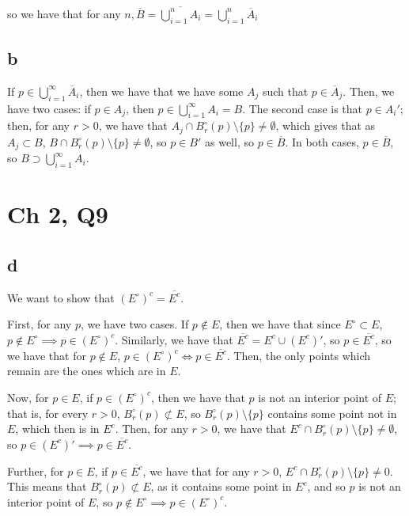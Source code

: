 \documentclass[12pt,letterpaper]{article}
\theoremstyle{definition}
\begin{document}
so we have that for any $n, \overline{B} = \overline{\bigcup_{i=1}^{n}A_{i}} = \bigcup_{i=1}^{n}\overline{A}_{i}$

\subsection*{b}

If $p \in \bigcup_{i=1}^{\infty}\overline{A}_{i}$, then we have that we have some $A_{j}$ such that $p \in \overline{A}_{j}$. Then, we have two cases: if $p \in A_{j}$, then $p \in \bigcup_{i=1}^{\infty}A_{i} = B$. The second case is that $p \in A_{i}'$; then, for any $r > 0$, we have that $A_{j} \cap B_{r}^{\circ}(p) \setminus \{p\}  \neq \emptyset$, which gives that as $A_{j} \subset B$, $B \cap B_{r}^{\circ}(p) \setminus \{p\}  \neq \emptyset$, so $p \in B'$ as well, so $p \in \overline{B}$. In both cases, $p \in \overline{B}$, so $B \supset \bigcup_{i=1}^{\infty}A_{i}$.

\section*{Ch 2, Q9}
\subsection*{d}

We want to show that $(E^{\circ})^{c} = \overline{E^{c}}$.

First, for any $p$, we have two cases. If $p \notin E$, then we have that since $E^{\circ} \subset E$, $p \notin E^{\circ} \implies p \in (E^{\circ})^{c}$. Similarly, we have that $\overline{E^{c}} = E^{c} \cup (E^{c})'$, so $p \in \overline{E^{c}}$, so we have that for $p \notin E$, $p \in (E^{\circ})^{c} \iff p \in \overline{E^{c}}$. Then, the only points which remain are the ones which are in $E$.

Now, for $p \in E$, if $p \in (E^{\circ})^{c}$, then we have that $p$ is not an interior point of $E$; that is, for every $r>0$, $B_{r}^{\circ}(p) \not\subset E$, so $B_{r}^{\circ}(p) \setminus \{p\}$ contains some point not in $E$, which then is in $E^{c}$. Then, for any $r > 0$, we have that $E^{c} \cap B_{r}^{\circ}(p)  \setminus \{p\} \neq \emptyset$, so $p \in (E^{c})' \implies p \in \overline{E^{c}}$.

Further, for $p \in E$, if $p \in \overline{E^{c}}$, we have that for any $r > 0$, $E^{c} \cap B_{r}^{\circ}(p) \setminus \{p\} \neq 0$. This means that $B_{r}^{\circ}(p) \not\subset E$, as it contains some point in $E^{c}$,  and so $p$ is not an interior point of $E$, so $p \notin E^{\circ} \implies p \in (E^{\circ})^{c}$.
\end{document}
